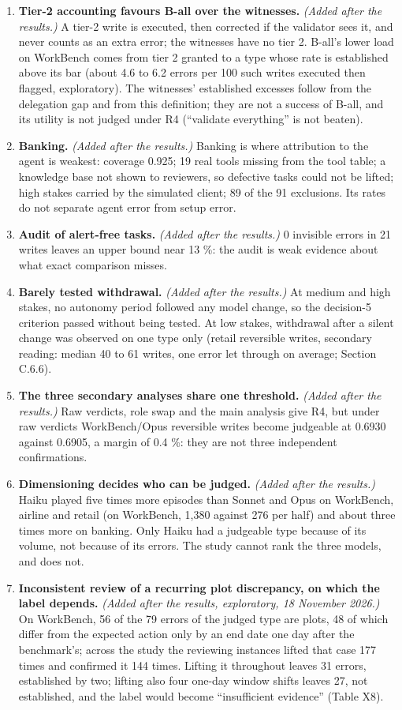 \begin{enumerate}
\item
  \textbf{Tier-2 accounting favours B-all over the witnesses.} \emph{(Added after the results.)} A tier-2 write is executed, then corrected if the validator sees it, and never counts as an extra error; the witnesses have no tier 2. B-all's lower load on WorkBench comes from tier 2 granted to a type whose rate is established above its bar (about 4.6 to 6.2 errors per 100 such writes executed then flagged, exploratory). The witnesses' established excesses follow from the delegation gap and from this definition; they are not a success of B-all, and its utility is not judged under R4 (``validate everything'' is not beaten).
\item
  \textbf{Banking.} \emph{(Added after the results.)} Banking is where attribution to the agent is weakest: coverage 0.925; 19 real tools missing from the tool table; a knowledge base not shown to reviewers, so defective tasks could not be lifted; high stakes carried by the simulated client; 89 of the 91 exclusions. Its rates do not separate agent error from setup error.
\item
  \textbf{Audit of alert-free tasks.} \emph{(Added after the results.)} 0 invisible errors in 21 writes leaves an upper bound near 13 \%: the audit is weak evidence about what exact comparison misses.
\item
  \textbf{Barely tested withdrawal.} \emph{(Added after the results.)} At medium and high stakes, no autonomy period followed any model change, so the decision-5 criterion passed without being tested. At low stakes, withdrawal after a silent change was observed on one type only (retail reversible writes, secondary reading: median 40 to 61 writes, one error let through on average; Section C.6.6).
\item
  \textbf{The three secondary analyses share one threshold.} \emph{(Added after the results.)} Raw verdicts, role swap and the main analysis give R4, but under raw verdicts WorkBench/Opus reversible writes become judgeable at 0.6930 against 0.6905, a margin of 0.4 \%: they are not three independent confirmations.
\item
  \textbf{Dimensioning decides who can be judged.} \emph{(Added after the results.)} Haiku played five times more episodes than Sonnet and Opus on WorkBench, airline and retail (on WorkBench, 1,380 against 276 per half) and about three times more on banking. Only Haiku had a judgeable type because of its volume, not because of its errors. The study cannot rank the three models, and does not.
\item
  \textbf{Inconsistent review of a recurring plot discrepancy, on which the label depends.} \emph{(Added after the results, exploratory, 18 November 2026.)} On WorkBench, 56 of the 79 errors of the judged type are plots, 48 of which differ from the expected action only by an end date one day after the benchmark's; across the study the reviewing instances lifted that case 177 times and confirmed it 144 times. Lifting it throughout leaves 31 errors, established by two; lifting also four one-day window shifts leaves 27, not established, and the label would become ``insufficient evidence'' (Table X8).
\end{enumerate}

